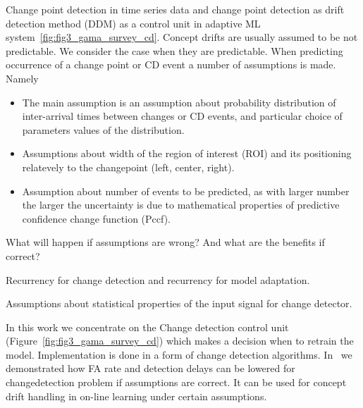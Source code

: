 Change point detection in time series data and change point detection as drift detection method (DDM) as a control unit in adaptive ML system~\ref{fig:fig3_gama_survey_cd}.
Concept drifts are usually assumed to be not predictable.
We consider the case when they are predictable.
When predicting occurrence of a change point or CD event a number of assumptions is made.
Namely
\begin{itemize}
  \item The main assumption is an assumption about probability distribution of inter-arrival times between changes or CD events, and particular choice of parameters values of the distribution. 
  \item Assumptions about width of the region of interest (ROI) and its positioning relatevely to the changepoint (left, center, right).
  \item Assumption about number of events to be predicted, as with larger number the larger the uncertainty is due to mathematical properties of predictive confidence change function (Pccf).
\end{itemize}
What will happen if assumptions are wrong? And what are the benefits if correct?

Recurrency for change detection and recurrency for model adaptation.

Assumptions about statistical properties of the input signal for change detector. 

In this work we concentrate on the Change detection control unit (Figure~\ref{fig:fig3_gama_survey_cd}) which makes a decision when to retrain the model.
Implementation is done in a form of change detection algorithms.
In~\cite{XXX} we demonstrated how FA rate and detection delays can be lowered for changedetection problem if assumptions are correct.
It can be used for concept drift handling in on-line learning under certain assumptions.

